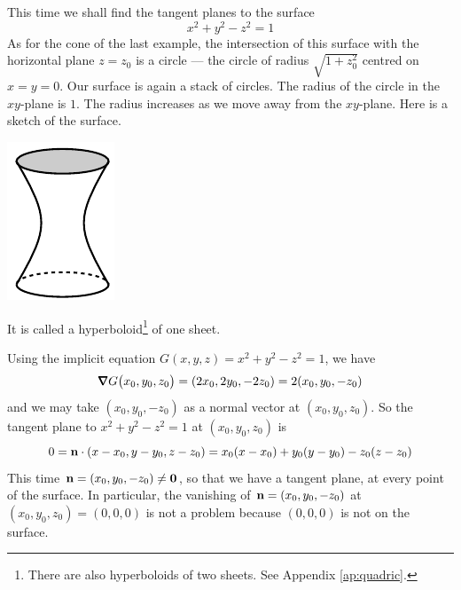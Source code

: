 \begin{eg}\label{eg:tangentPlaneB}
This time we shall find the tangent planes to the surface
\begin{equation*}
x^2 + y^2 -z^2 = 1
\end{equation*}
As for the cone of the last example, the intersection of 
this surface with the horizontal plane $z=z_0$ is a circle ---
the circle of radius $\sqrt{1+z_0^2}$  centred on $x=y=0$.
Our surface is again a stack of circles. The radius of the circle 
in the $xy$-plane is $1$. The radius increases as we move away from the $xy$-plane. Here is a sketch of the surface.
\begin{efig}
\begin{center}
    \includegraphics{hyperboloid1.pdf}
\end{center}
\end{efig}
It is called a hyperboloid\footnote{There are also hyperboloids of two sheets.
See Appendix \ref{ap:quadric}.} of one sheet. 

Using the implicit equation $G(x,y,z) = x^2+y^2-z^2=1$, we have
\begin{equation*}
\vnabla G\big(x_0,y_0,z_0\big) = (2x_0,2y_0,-2z_0) =2(x_0,y_0,-z_0)
\end{equation*}
and we may take $(x_0,y_0,-z_0)$ as a normal vector at $(x_0,y_0,z_0)$.
So the tangent plane to $x^2+y^2-z^2=1$ at $(x_0,y_0,z_0)$ is
\begin{equation*}
0=\mathbf{n}\cdot(x-x_0,y-y_0,z-z_0)
 = x_0(x-x_0)+y_0(y-y_0) - z_0(z-z_0)
\end{equation*}
This time $\mathbf{n}=(x_0,y_0,-z_0)\ne \mathbf{0}$, so that we have a tangent plane, at 
every point of the surface. In particular, the vanishing of 
$\mathbf{n}=(x_0,y_0,-z_0)$ at $(x_0,y_0,z_0)=(0,0,0)$ is not a problem because 
$(0,0,0)$ is not on the surface.

\end{eg}

